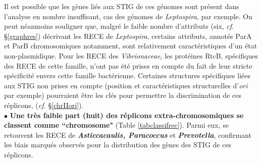 	Il est possible que les gènes liés aux STIG de ces génomes sont présent dans l'analyse en nombre insuffisant, cas des génomes de \textit{Leptospira}, par exemple. On peut néanmoins souligner que, malgré le faible nombre d'attributs (six, \textit{cf.} \S \ref{graphres}) décrivant les RECE de \textit{Leptospira}, certains attributs, annotés ParA et ParB chromosomiques notamment, sont relativement caractéristiques d'un état non-plasmidique. Pour les RECE des \textit{Vibrionaceae}, les protéines RtcB, spécifiques des RECE de cette famille, n'ont pas été prises en compte du fait de leur stricte spécificité envers cette famille bactérienne. Certaines structures spécifiques liées aux STIG non prises en compte (position et caractéristiques structurelles d'\textit{ori} par exemple) pourraient être les clés pour permettre la discrimination de ces réplicons, (\textit{cf.} \S \ref{chrIIori}). \\

$\bullet$ \textbf{Une très faible part (huit) des réplicons extra-chromosomiques se classent comme ``chromosome"} (Table \ref{tabclassifrec}). Parmi eux, se retouvent les RECE de \textbf{\textit{Asticcacaulis, Paracoccus}} et \textbf{\textit{Prevotella}}, confirmant les biais marqués observés pour la distribution des gènes des STIG de ces réplicons.

